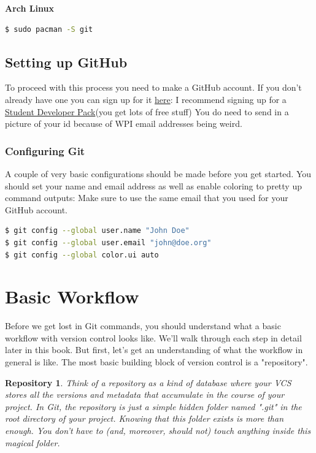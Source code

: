 \documentclass{article}
\begin{document}
\textbf{Arch Linux}
\begin{lstlisting}[language=bash]
$ sudo pacman -S git
\end{lstlisting}

\subsection{Setting up GitHub}

To proceed with this process you need to make a GitHub account. 
\newline\newline
If you don't already have one you can sign up for it \href{https://github.com/join?source=header-home}{here}:
\newline\newline
I recommend signing up for a \href{https://education.github.com/pack}{Student Developer Pack}(you get lots of free stuff)
\newline\newline
You do need to send in a picture of your id because of WPI email addresses being weird.

\subsubsection{Configuring Git}
A couple of very basic configurations should be made before you get started. You should set your name and email address as well as enable coloring to pretty up command outputs:
\newline\newline
Make sure to use the same email that you used for your GitHub account.

\begin{lstlisting}[language=bash]
$ git config --global user.name "John Doe"
$ git config --global user.email "john@doe.org"
$ git config --global color.ui auto
\end{lstlisting}

\section{Basic Workflow}

Before we get lost in Git commands, you should understand what a basic workflow with version control looks like. We'll walk through each step in detail later in this book. But first, let's get an understanding of what the workflow in general is like.
\newline\newline
The most basic building block of version control is a "repository".
\newtheorem*{repository}{Repository}
\begin{repository}
Think of a repository as a kind of database where your VCS stores all the versions and metadata that accumulate in the course of your project. In Git, the repository is just a simple hidden folder named ".git" in the root directory of your project. Knowing that this folder exists is more than enough. You don't have to (and, moreover, should not) touch anything inside this magical folder.
\end{repository}
\end{document}
